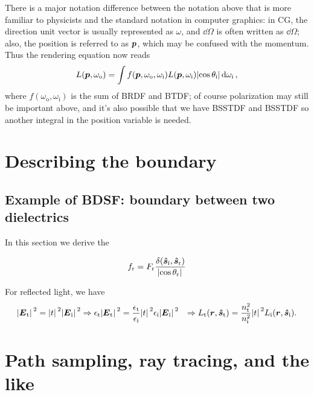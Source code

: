 \documentclass[hyperref, a4paper]{article}
\def\\{}%
\begin{document}
There is a major notation difference between the notation above that is more familiar to physicists
and the standard notation in computer graphics:
in CG, the direction unit vector is usually represented as $\omega$, 
and $\dd{\Omega}$ is often written as $\dd{\Omega}$;
also, the position is referred to as $\vb*{p}$, 
which may be confused with the momentum.
Thus the rendering equation now reads 
\begin{equation}
    L(\vb*{p}, \omega_{\text{o}}) 
    = \int f(\vb*{p}, \omega_{\text{o}}, \omega_{\text{i}}) 
    L(\vb*{p}, \omega_{\text{i}}) \abs{\cos \theta_{\text{i}}} \dd{\omega_{\text{i}}},
\end{equation}
where $f(\omega_{\text{o}}, \omega_{\text{i}})$ 
is the sum of BRDF and BTDF; 
of course polarization may still be important above, 
and it's also possible that we have BSSTDF and BSSTDF 
so another integral in the position variable is needed.

\section{Describing the boundary}

\subsection{Example of BDSF: boundary between two dielectrics}

In this section we derive the 

\begin{equation}
    f_{\text{r}} = F_{\text{r}} \frac{\delta(\vu*{s}_\text{i}, \vu*{s}_{\text{r}})}{\abs*{\cos \theta_{\text{r}}}}
\end{equation}

For reflected light, we have 
\begin{equation}
    \begin{aligned}
        \abs*{\vb*{E}_{\text{t}}}^2 = \abs*{t}^2 \abs*{\vb*{E}_{\text{i}}}^2 
        &\Rightarrow \epsilon_{\text{t}} \abs*{\vb*{E}_{\text{t}}}^2 
        = \frac{\epsilon_{\text{t}}}{\epsilon_{\text{i}}} \abs*{t}^2 \epsilon_{\text{i}} \abs*{\vb*{E}_{\text{i}}}^2 \\
        &\Rightarrow L_{\text{t}}(\vb*{r}, \vu*{s}_{\text{t}}) 
        = \frac{n_{\text{t}}^2}{n_{\text{i}}^2} \abs*{t}^2 L_{\text{i}}(\vb*{r}, \vu*{s}_{\text{i}}).
    \end{aligned}
\end{equation}

\section{Path sampling, ray tracing, and the like}
\end{document}
